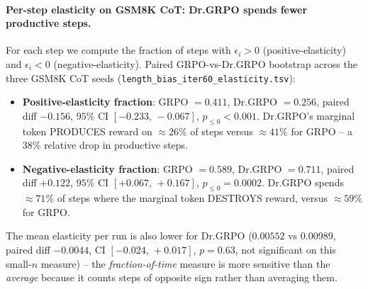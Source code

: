 \paragraph{Per-step elasticity on GSM8K CoT: Dr.GRPO spends fewer
productive steps.}
For each step we compute the fraction of steps with $\epsilon_i > 0$
(positive-elasticity) and $\epsilon_i < 0$ (negative-elasticity).
Paired GRPO-vs-Dr.GRPO bootstrap across the three GSM8K CoT seeds
(\texttt{length\_bias\_iter60\_elasticity.tsv}):
\begin{itemize}
\item \textbf{Positive-elasticity fraction}:
      GRPO $= 0.411$, Dr.GRPO $= 0.256$,
      paired diff $-0.156$, $95\%$ CI $[-0.233,\, -0.067]$,
      $p_{\le 0} < 0.001$. Dr.GRPO's marginal token PRODUCES reward
      on $\approx 26\%$ of steps versus $\approx 41\%$ for GRPO -- a
      $38\%$ relative drop in productive steps.
\item \textbf{Negative-elasticity fraction}:
      GRPO $= 0.589$, Dr.GRPO $= 0.711$,
      paired diff $+0.122$, $95\%$ CI $[+0.067,\, +0.167]$,
      $p_{\le 0} = 0.0002$. Dr.GRPO spends $\approx 71\%$ of steps
      where the marginal token DESTROYS reward, versus $\approx 59\%$
      for GRPO.
\end{itemize}
The mean elasticity per run is also lower for Dr.GRPO
($0.00552$ vs $0.00989$, paired diff $-0.0044$, CI $[-0.024,\, +0.017]$,
$p = 0.63$, not significant on this small-$n$ measure) -- the
\emph{fraction-of-time} measure is more sensitive than the \emph{average}
because it counts steps of opposite sign rather than averaging them.

